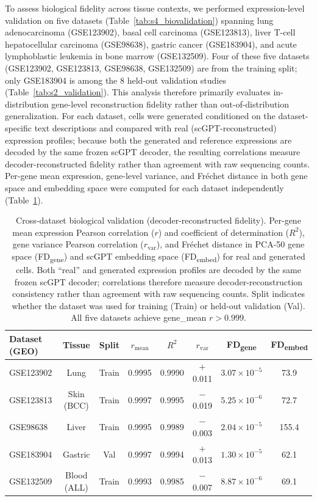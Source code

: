\documentclass[11pt,a4paper]{article}
\begin{document}
To assess biological fidelity across tissue contexts, we performed expression-level validation on five datasets (Table~\ref{tab:s4_biovalidation}) spanning lung adenocarcinoma (GSE123902), basal cell carcinoma (GSE123813), liver T-cell hepatocellular carcinoma (GSE98638), gastric cancer (GSE183904), and acute lymphoblastic leukemia in bone marrow (GSE132509). Four of these five datasets (GSE123902, GSE123813, GSE98638, GSE132509) are from the training split; only GSE183904 is among the 8 held-out validation studies (Table~\ref{tab:s2_validation}). This analysis therefore primarily evaluates in-distribution gene-level reconstruction fidelity rather than out-of-distribution generalization. For each dataset, cells were generated conditioned on the dataset-specific text descriptions and compared with real (scGPT-reconstructed) expression profiles; because both the generated and reference expressions are decoded by the same frozen scGPT decoder, the resulting correlations measure decoder-reconstructed fidelity rather than agreement with raw sequencing counts. Per-gene mean expression, gene-level variance, and Fr\'{e}chet distance in both gene space and embedding space were computed for each dataset independently (Table~\ref{tab:cross-dataset}).

\begin{table}[!htbp]
\caption{Cross-dataset biological validation (decoder-reconstructed fidelity). Per-gene mean expression Pearson correlation ($r$) and coefficient of determination ($R^2$), gene variance Pearson correlation ($r_\text{var}$), and Fr\'{e}chet distance in PCA-50 gene space (FD\textsubscript{gene}) and scGPT embedding space (FD\textsubscript{embed}) for real and generated cells. Both ``real'' and generated expression profiles are decoded by the same frozen scGPT decoder; correlations therefore measure decoder-reconstruction consistency rather than agreement with raw sequencing counts. Split indicates whether the dataset was used for training (Train) or held-out validation (Val). All five datasets achieve gene\_mean $r > 0.999$.\label{tab:cross-dataset}}
\centering
\small
\begin{tabular}{lccccccc}
\toprule
\textbf{Dataset (GEO)} & \textbf{Tissue} & \textbf{Split} & \textbf{$r_\text{mean}$} & \textbf{$R^2$} & \textbf{$r_\text{var}$} & \textbf{FD\textsubscript{gene}} & \textbf{FD\textsubscript{embed}} \\
\midrule
GSE123902 & Lung     & Train & 0.9995 & 0.9990 & $+$0.011  & $3.07 \times 10^{-5}$ & 73.9 \\
GSE123813 & Skin (BCC)  & Train & 0.9997 & 0.9995 & $-$0.019  & $5.25 \times 10^{-6}$ & 72.7 \\
GSE98638  & Liver    & Train & 0.9995 & 0.9989 & $-$0.003  & $2.04 \times 10^{-5}$ & 155.4 \\
GSE183904 & Gastric  & Val & 0.9997 & 0.9994 & $+$0.013  & $1.30 \times 10^{-5}$ & 62.1 \\
GSE132509 & Blood (ALL)  & Train & 0.9993 & 0.9985 & $-$0.007  & $8.87 \times 10^{-6}$ & 69.1 \\
\bottomrule
\end{tabular}
\end{table}
\end{document}
